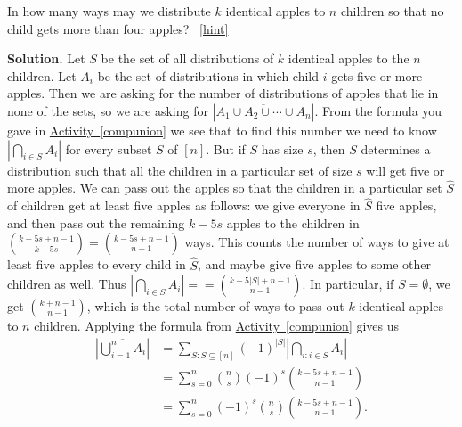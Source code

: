 \documentclass{book}
\begin{document}
\setcounter{project}{225}
\addtocounter{project}{-1}
\begin{activity}[]\label{act_restrictedmultisetspie}
\hypertarget{p-1271}{}%
In how many ways may we distribute \(k\) identical apples to \(n\) children so that no child gets more than four apples?%
~\hfill{\tiny\hyperlink{a-225}{[hint]}\hypertarget{q-225}{}}\par\smallskip%
\noindent\textbf{Solution.}\hypertarget{solution-161}{}\quad%
\hypertarget{p-1273}{}%
Let \(S\) be the set of all distributions of \(k\) identical apples to the \(n\) children. Let \(A_i\) be the set of distributions in which child \(i\) gets five or more apples. Then we are asking for the number of distributions of apples that lie in none of the sets, so we are asking for \(|\overline{A_1\cup A_2\cup \cdots \cup A_n}|\). From the formula you gave in \hyperref[compunion]{Activity~\ref{compunion}} we see that to find this number we need to know \(|\bigcap_{i\in S}A_i|\) for every subset \(S\) of \([n]\). But if \(S\) has size \(s\), then \(S\) determines a distribution such that all the children in a particular set of size \(s\) will get five or more apples. We can pass out the apples so that the children in a particular set \(\hat S\) of children get at least five apples as follows: we give everyone in \(\hat
S\) five apples, and then pass out the remaining \(k-5s\) apples to the children in \(\binom{k-5s+n-1}{k-5s}= \binom{k-5s+n-1}{n-1}\) ways. This counts the number of ways to give at least five apples to every child in \(\hat S\), and maybe give five apples to some other children as well. Thus \(|\bigcap_{i\in S}A_i| = = \binom{k-5|S|+n-1}{n-1}\). In particular, if \(S=\emptyset\), we get \(\binom{k+n-1}{n-1}\), which is the total number of ways to pass out \(k\) identical apples to \(n\) children. Applying the formula from \hyperref[compunion]{Activity~\ref{compunion}} gives us%
\begin{align*}
\left| \overline{\bigcup_{i=1}^n A_i}\right|&= \sum_{S:S\subseteq [n]}(-1)^{|S|}\left|\bigcap _{i\colon i\in S} A_i\right|\\
&= \sum_{s=0}^n \binom{n}{s}(-1)^s \binom{k-5s+n-1}{n-1}\\
&= \sum_{s=0}^n (-1)^s\binom{n}{s}\binom{k-5s+n-1}{n-1}\text{.}
\end{align*}
%
\end{activity}
\end{document}
